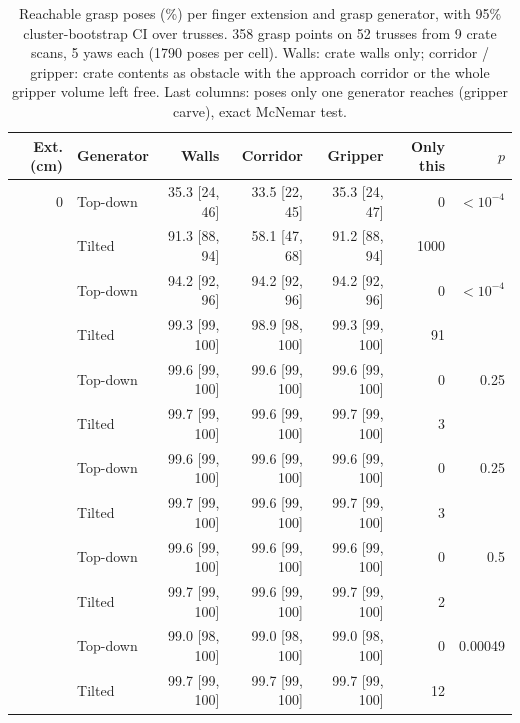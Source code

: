 \begin{table}[htbp]
\centering
\small
\caption{Reachable grasp poses (\%) per finger extension and grasp generator, with 95\% cluster-bootstrap CI over trusses. 358 grasp points on 52 trusses from 9 crate scans, 5 yaws each (1790 poses per cell). Walls: crate walls only; corridor / gripper: crate contents as obstacle with the approach corridor or the whole gripper volume left free. Last columns: poses only one generator reaches (gripper carve), exact McNemar test.}
\label{tab:e3_finger_reachability}
\begin{tabular}{rlrrrrr}
\toprule
Ext. (cm) & Generator & Walls & Corridor & Gripper & Only this & $p$ \\
\midrule
0 & Top-down & 35.3 [24, 46] & 33.5 [22, 45] & 35.3 [24, 47] & 0 & $<10^{-4}$ \\
 & Tilted & 91.3 [88, 94] & 58.1 [47, 68] & 91.2 [88, 94] & 1000 &  \\
\addlinespace
5 & Top-down & 94.2 [92, 96] & 94.2 [92, 96] & 94.2 [92, 96] & 0 & $<10^{-4}$ \\
 & Tilted & 99.3 [99, 100] & 98.9 [98, 100] & 99.3 [99, 100] & 91 &  \\
\addlinespace
9 & Top-down & 99.6 [99, 100] & 99.6 [99, 100] & 99.6 [99, 100] & 0 & 0.25 \\
 & Tilted & 99.7 [99, 100] & 99.6 [99, 100] & 99.7 [99, 100] & 3 &  \\
\addlinespace
10 & Top-down & 99.6 [99, 100] & 99.6 [99, 100] & 99.6 [99, 100] & 0 & 0.25 \\
 & Tilted & 99.7 [99, 100] & 99.6 [99, 100] & 99.7 [99, 100] & 3 &  \\
\addlinespace
13 & Top-down & 99.6 [99, 100] & 99.6 [99, 100] & 99.6 [99, 100] & 0 & 0.5 \\
 & Tilted & 99.7 [99, 100] & 99.6 [99, 100] & 99.7 [99, 100] & 2 &  \\
\addlinespace
20 & Top-down & 99.0 [98, 100] & 99.0 [98, 100] & 99.0 [98, 100] & 0 & 0.00049 \\
 & Tilted & 99.7 [99, 100] & 99.7 [99, 100] & 99.7 [99, 100] & 12 &  \\
\bottomrule
\end{tabular}
\end{table}
